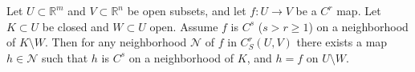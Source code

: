 Let $U \subset \mathbb{R}^m$ and $V \subset \mathbb{R}^n$ be open subsets, and let $f: U \to V$ be a $C^r$ map. Let $K \subset U$ be closed and $W \subset U$ open. Assume $f$ is $C^s$ ($s > r \geqslant 1$) on a neighborhood of $K \setminus W$. Then for any neighborhood $\mathcal{N}$ of $f$ in $C^r_S(U, V)$ there exists a map $h \in \mathcal{N}$ such that $h$ is $C^s$ on a neighborhood of $K$, and $h = f$ on $U \setminus W$.
